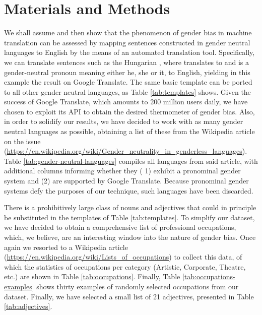 \documentclass[jair,twoside,11pt,theapa]{article}
\begin{document}
\section{Materials and Methods}

We shall assume and then show that the phenomenon of gender bias in machine translation can be assessed by mapping sentences constructed in gender neutral languages to English by the means of an automated translation tool. Specifically, we can translate sentences such as the Hungarian , where  translates to  and  is a gender-neutral pronoun meaning either he, she or it, to English, yielding in this example the result  on Google Translate. The same basic template can be ported to all other gender neutral languages, as Table \ref{tab:templates} shows. Given the success of Google Translate, which amounts to 200 million users daily, we have chosen to exploit its API to obtain the desired thermometer of gender bias. Also, in order to solidify our results, we have decided to work with as many gender neutral languages as possible, obtaining a list of these from the Wikipedia article on the issue (\url{https://en.wikipedia.org/wiki/Gender_neutrality_in_genderless_languages}). Table \ref{tab:gender-neutral-languages} compiles all languages from said article, with additional columns informing whether they
( 1) exhibit a pronominal gender system and (2) are supported by Google Translate. Because pronominal gender systems defy the purposes of our technique, such languages have been discarded. 

There is a prohibitively large class of nouns and adjectives that could in principle be substituted in the templates of Table \ref{tab:templates}. To simplify our dataset, we have decided to obtain a comprehensive list of professional occupations, which, we believe, are an interesting window into the nature of gender bias. Once again we resorted to a Wikipedia article (\url{https://en.wikipedia.org/wiki/Lists_of_occupations}) to collect this data, of which the statistics of occupations per category (Artistic, Corporate, Theatre, etc.) are shown in Table \ref{tab:occupations}. Finally, Table \ref{tab:occupations-examples} shows thirty examples of randomly selected occupations from our dataset. Finally, we have selected a small list of 21 adjectives, presented in Table \ref{tab:adjectives}.
\end{document}
